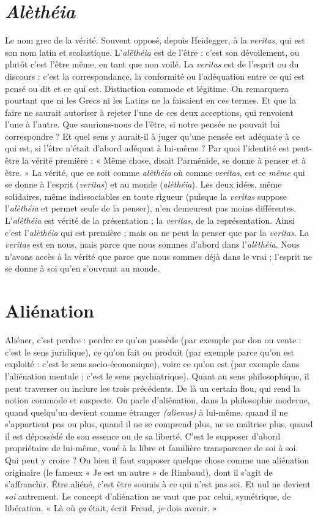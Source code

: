 \section{\it Alèthéia}
Le nom grec de la vérité. Souvent opposé, depuis Heidegger, à la
{\it veritas}, qui est son nom latin et scolastique. L’{\it alèthéia} est de
l'être : c’est son dévoilement, ou plutôt c’est l'être même, en tant que non voilé.
La {\it veritas} est de l’esprit ou du discours : c’est la correspondance, la conformité
ou l’adéquation entre ce qui est pensé ou dit et ce qui est. Distinction commode
et légitime. On remarquera pourtant que ni les Grecs ni les Latins ne la
faisaient en ces termes. Et que la faire ne saurait autoriser à rejeter l’une de ces
deux acceptions, qui renvoient l’une à l’autre. Que saurions-nous de l'être, si
notre pensée ne pouvait lui correspondre ? Et quel sens y aurait-il à juger
qu’une pensée est adéquate à ce qui est, si l’être n’était d’abord adéquat à lui-même ?
Par quoi l’identité est peut-être la vérité première : « Même chose,
disait Parménide, se donne à penser et à être. » La vérité, que ce soit comme
{\it alèthéia} où comme {\it veritas}, est ce {\it même} qui se donne à l'esprit ({\it veritas}) et au
monde ({\it alèthéia}). Les deux idées, même solidaires, même indissociables en
toute rigueur (puisque la {\it veritas} suppose l’{\it alèthéia} et permet seule de la penser),
n’en demeurent pas moins différentes. L’{\it alèthéia} est vérité de la présentation ;
la {\it veritas}, de la représentation. Ainsi c’est l’{\it alèthéia} qui est première ; mais on
ne peut la penser que par la {\it veritas}. La {\it veritas} est en nous, mais parce que nous
sommes d’abord dans l’{\it alèthéia}. Nous n’avons accès à la vérité que parce que
nous sommes déjà dans le vrai ; l'esprit ne se donne à soi qu’en s’ouvrant au
monde.

\section{Aliénation}
Aliéner, c’est perdre : perdre ce qu’on possède (par exemple
par don ou vente : c’est le sens juridique), ce qu’on fait ou
produit (par exemple parce qu’on est exploité : c’est le sens socio-économique),
voire ce qu’on est (par exemple dans l’aliénation mentale : c’est le sens psychiatrique).
Quant au sens philosophique, il peut traverser ou inclure les trois précédents.
De là un certain flou, qui rend la notion commode et suspecte. On
parle d’aliénation, dans la philosophie moderne, quand quelqu'un devient
comme étranger {\it (alienus)} à lui-même, quand il ne s’appartient pas ou plus,
quand il ne se comprend plus, ne se maîtrise plus, quand il est dépossédé de son
essence ou de sa liberté. C’est le supposer d’abord propriétaire de lui-même,
voué à la libre et familière transparence de soi à soi. Qui peut y croire ? Ou bien
il faut supposer quelque chose comme une aliénation originaire (le fameux « Je
est un autre » de Rimbaud), dont il s’agit de s’affranchir. Être aliéné, c’est être
soumis à ce qui n'est pas soi. Et nul ne devient {\it soi} autrement. Le concept d’aliénation
ne vaut que par celui, symétrique, de libération. « Là où {\it ça} était, écrit
Freud, {\it je} dois avenir. »

